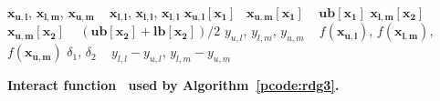 \begin{algorithm}
	\SetAlgoLined

	$\mathbf{x_{u,l}}$, $\mathbf{x_{l,m}}$, $\mathbf{x_{u,m}}$  \gets~ $\mathbf{x_{l,l}}$, $\mathbf{x_{l,l}}$, $\mathbf{x_{l,l}}$\;
	$\mathbf{x_{u,l}}[\mathbf{x_1}]$ \gets~$\mathbf{x_{u,m}}[\mathbf{x_1}]$ \gets~ $\mathbf{ub}[\mathbf{x_1}]$\;
	$\mathbf{x_{l,m}}[\mathbf{x_2}]$ \gets~ $\mathbf{x_{u,m}}[\mathbf{x_2}]$ \gets~ $(\mathbf{ub}[\mathbf{x_2}] + \mathbf{lb}[\mathbf{x_2}]) / 2$\;
	$y_{u,l}$, $y_{l,m}$, $y_{u,m}$ \gets~ $f(\mathbf{x_{u,l}})$, $f(\mathbf{x_{l,m}})$, $f(\mathbf{x_{u,m}})$\;
	$\delta_1$, $\delta_2$ \gets~ $y_{l,l} - y_{u,l}$, $y_{l,m} - y_{u,m}$\;
	\;

	\caption{\textbf{Interact function~\cite{alg:rdg3} used by Algorithm~\ref{pcode:rdg3}.}}
	\label{pcode:interact}
\end{algorithm}